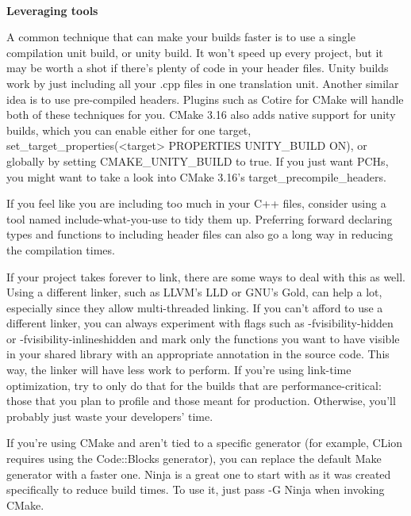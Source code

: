 \hspace*{\fill} \\ %
\noindent
\textbf{Leveraging tools}

A common technique that can make your builds faster is to use a single compilation unit build, or unity build. It won't speed up every project, but it may be worth a shot if there's plenty of code in your header files. Unity builds work by just including all your .cpp files in one translation unit. Another similar idea is to use pre-compiled headers. Plugins such as Cotire for CMake will handle both of these techniques for you. CMake 3.16 also adds native support for unity builds, which you can enable either for one target, set\_target\_properties(<target> PROPERTIES UNITY\_BUILD ON), or globally by setting CMAKE\_UNITY\_BUILD to true. If you just want PCHs, you might want to take a look into CMake 3.16's target\_precompile\_headers.

\begin{tcolorbox}[colback=webgreen!5!white,colframe=webgreen!75!black, title=TIP]
\hspace*{0.7cm}If you feel like you are including too much in your C++ files, consider using a tool named include-what-you-use to tidy them up. Preferring forward declaring types and functions to including header files can also go a long way in reducing the compilation times.
\end{tcolorbox}

If your project takes forever to link, there are some ways to deal with this as well. Using a different linker, such as LLVM's LLD or GNU's Gold, can help a lot, especially since they allow multi-threaded linking. If you can't afford to use a different linker, you can always experiment with flags such as -fvisibility-hidden or -fvisibility-inlineshidden and mark only the functions you want to have visible in your shared library with an appropriate annotation in the source code. This way, the linker will have less work to perform. If you're using link-time optimization, try to only do that for the builds that are performance-critical: those that you plan to profile and those meant for production. Otherwise, you'll probably just waste your developers' time.

If you're using CMake and aren't tied to a specific generator (for example, CLion requires using the Code::Blocks generator), you can replace the default Make generator with a faster one. Ninja is a great one to start with as it was created specifically to reduce build times. To use it, just pass -G Ninja when invoking CMake.

